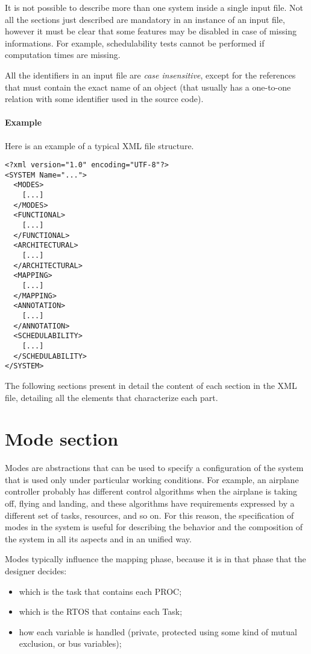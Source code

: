 It is not possible to describe more than one system inside a single
input file. Not all the sections just described are mandatory in an
instance of an input file, however it must be clear that some features
may be disabled in case of missing informations. For example,
schedulability tests cannot be performed if computation times are
missing.

All the identifiers in an input file are \emph{case insensitive},
except for the references that must contain the exact name of an
object (that usually has a one-to-one relation with some identifier
used in the source code).


\paragraph{Example}

Here is an example of a typical XML file structure.

\begin{lstlisting}
<?xml version="1.0" encoding="UTF-8"?>
<SYSTEM Name="...">
  <MODES>
    [...]
  </MODES>
  <FUNCTIONAL>
    [...]
  </FUNCTIONAL>
  <ARCHITECTURAL>
    [...]
  </ARCHITECTURAL>
  <MAPPING>
    [...]
  </MAPPING>
  <ANNOTATION>
    [...]
  </ANNOTATION>
  <SCHEDULABILITY>
    [...]
  </SCHEDULABILITY>
</SYSTEM>
\end{lstlisting}

The following sections present in detail the content of each section
in the XML file, detailing all the elements that characterize each
part.


\section{Mode section}
\label{sec:Mode-section}

Modes are abstractions that can be used to specify a configuration of
the system that is used only under particular working conditions.  For
example, an airplane controller probably has different control
algorithms when the airplane is taking off, flying and landing, and
these algorithms have requirements expressed by a different set of
tasks, resources, and so on. For this reason, the specification of
modes in the system is useful for describing the behavior and the
composition of the system in all its aspects and in an unified way.

Modes typically influence the mapping phase, because it is in that
phase that the designer decides:

\begin{itemize}
\item which is the task that contains each PROC;
\item which is the RTOS that contains each Task;
\item how each variable is handled (private, protected using some kind
  of mutual exclusion, or bus variables);
\end{itemize}

